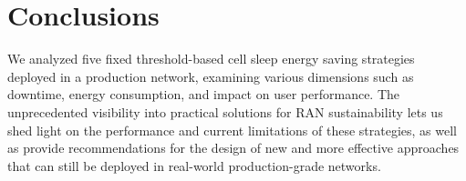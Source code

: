 \documentclass[10pt, conference, letterpaper]{IEEEtran}
\begin{document}
\begin{abstract}
%
\end{abstract}














\section{Conclusions}
We analyzed five fixed threshold-based cell sleep energy saving strategies deployed in a production network, examining various dimensions such as downtime, energy consumption, and impact on user performance. The unprecedented visibility into practical solutions for RAN sustainability lets us shed light on the performance and current limitations of these strategies, as well as provide recommendations for the design of new and more effective approaches that can still be deployed in real-world production-grade networks.

\newpage
\balance


\end{document}
